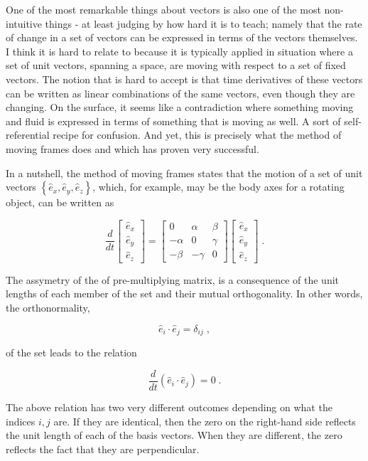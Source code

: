 \documentclass[10pt]{article}
\begin{document}
One of the most remarkable things about vectors is also one of the most non-intuitive things - at least judging by how hard it is to teach; namely that the rate of change in a set of vectors can be expressed in terms of the vectors themselves.  I think it is hard to relate to because it is typically applied in situation where a set of unit vectors, spanning a space, are moving with respect to a set of fixed vectors.  The notion that is hard to accept is that time derivatives of these vectors can be written as linear combinations of the same vectors, even though they are changing.  On the surface, it seems like a contradiction where something moving and fluid is expressed in terms of something that is moving as well. A sort of self-referential recipe for confusion.  And yet, this is precisely what the method of moving frames does and which has proven very successful.

In a nutshell, the method of moving frames states that the motion of a set of unit vectors $\left\{\hat e_x, \hat e_y, \hat e_z\right\}$, which, for example, may be the body axes for a rotating object, can be written as

\[ \frac{d}{dt} \left[ \begin{array}{c} \hat e_x \\ \hat e_y \\ \hat e_z \end{array} \right] = 
   \left[ \begin{array}{ccc} 0 & \alpha & \beta \\ -\alpha & 0 & \gamma \\ -\beta & -\gamma & 0 \end{array} \right]
   \left[ \begin{array}{c} \hat e_x \\ \hat e_y \\ \hat e_z \end{array} \right] \; .\]

The assymetry of the of pre-multiplying matrix, is a consequence of the unit lengths of each member of the set and their mutual orthogonality.  In other words, the orthonormality, 

\[ \hat e_i \cdot \hat e_j = \delta_{ij} \; ,\]

of the set leads to the relation

\[ \frac{d}{dt} \left( \hat e_i \cdot \hat e_j \right) = 0 \;. \]

The above relation has two very different outcomes depending on what the indices $i, j$ are.  If they are identical, then the zero on the right-hand side reflects the unit length of each of the basis vectors.  When they are different, the zero reflects the fact that they are perpendicular.
\end{document}
